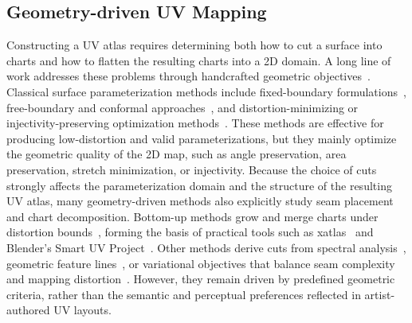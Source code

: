 
\subsection{Geometry-driven UV Mapping}

Constructing a UV atlas requires determining both how to cut a surface into charts and how to flatten the resulting charts into a 2D domain. 
A long line of work addresses these problems through handcrafted geometric objectives~\cite{floater2005surface, sheffer2006mesh}. 
Classical surface parameterization methods include fixed-boundary formulations~\cite{tutte1963draw}, free-boundary and conformal approaches~\cite{levy2002least, sheffer2001parameterization, sheffer2005abf, mullen2008spectral, sawhney2021boundary, ben2009conformal}, and distortion-minimizing or injectivity-preserving optimization methods~\cite{sorkine2007arap, hormann2000mips, rabinovich2017scalable, li2018optcuts, pietroni2010almost, digne2016area, chen2012optimizing}.
These methods are effective for producing low-distortion and valid parameterizations, but they mainly optimize the geometric quality of the 2D map, such as angle preservation, area preservation, stretch minimization, or injectivity.
Because the choice of cuts strongly affects the parameterization domain and the structure of the resulting UV atlas, many geometry-driven methods also explicitly study seam placement and chart decomposition.
Bottom-up methods grow and merge charts under distortion bounds~\cite{julius2005d, DBLP:conf/visualization/SorkineCGL02, sander2003multi, carr2006rectangular}, forming the basis of practical tools such as xatlas~\cite{young2019xatlas} and Blender's Smart UV Project~\cite{blender}.
Other methods derive cuts from spectral analysis~\cite{zhou2004iso}, geometric feature lines~\cite{zhang2005feature, carlsson2014optimized}, or variational objectives that balance seam complexity and mapping distortion~\cite{liu2007mesh, poranne2017autocuts, sharp2018variational, li2018optcuts}.
However, they remain driven by predefined geometric criteria, rather than the semantic and perceptual preferences reflected in artist-authored UV layouts.


